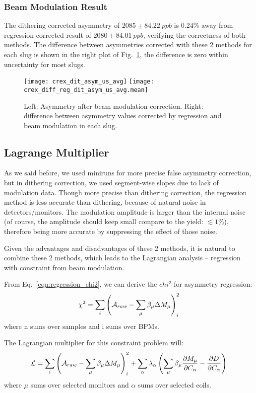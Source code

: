 \subsubsection{Beam Modulation Result}
The dithering corrected asymmetry of $2085 \pm 84.22\ ppb$ is $0.24\%$ away from
regression corrected result of $2080 \pm 84.01\ ppb$, verifying the correctness
of both methods. The difference between asymmetries corrected with these 2 methods
for each slug is shown in the right plot of Fig.~\ref{fig:dit_result}, the difference
is zero within uncertainty for most slugs.
\begin{figure}[H]
    \centering
    \texttt{[image: crex\_dit\_asym\_us\_avg]}
    \texttt{[image: crex\_diff\_reg\_dit\_asym\_us\_avg.mean]}
    \caption{Left: Asymmetry after beam modulation correction.
    Right: difference between asymmetry values corrected by regression and
    beam modulation in each slug.}
    \label{fig:dit_result}
\end{figure}


\subsection{Lagrange Multiplier}
As we said before, we used miniruns for more precise false asymmetry correction, 
but in dithering correction, we used segment-wise slopes due to lack of modulation
data. Though more precise than dithering correction, the regression method is 
less accurate than dithering, because of natural noise in detectors/monitors. 
The modulation amplitude is larger than the internal noise (of course, the amplitude
should keep small compare to the yield: $\lesssim 1\%$), therefore being
more accurate by suppressing the effect of those noise.

Given the advantages and disadvantages of these 2 methods, it is natural to 
combine these 2 methods, which leads to the Lagrangian analysis -- regression
with constraint from beam modulation.

From Eq.~\ref{eqn:regression_chi2}, we can derive the $chi^2$ for asymmetry regression:
\begin{equation}
    \chi^2 = \sum_i \left( \mathcal{A}_{raw} - \sum_\mu \beta_\mu \Delta M_\mu \right)_i^2
\end{equation}
where n sums over samples and i sums over BPMs.

The Lagrangian multiplier for this constraint problem will:
\begin{equation}
    \mathcal{L} = \sum_i \left( \mathcal{A}_{raw} - \sum_\mu \beta_\mu \Delta M_\mu \right)_i^2+ \sum_\alpha \lambda_\alpha \left(\sum_\mu \beta_\mu \frac{\partial M_\mu}{\partial C_\alpha} - \frac{\partial D}{\partial C_\alpha} \right)
\end{equation}
where $\mu$ sums over selected monitors and $\alpha$ sums over selected coils.

